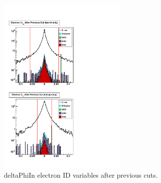  \begin{figure}[htb]
  \begin{center}


    \includegraphics[width=180pt, angle=90]{Figures/dPhiInSeq-01Apr11.pdf}
  \end{center}
  \caption[deltaPhiIn electron ID variables after previous cuts]{deltaPhiIn electron ID variables after previous cuts.}
  \label{fig:dPhiInElecIdVars}
 \end{figure}



